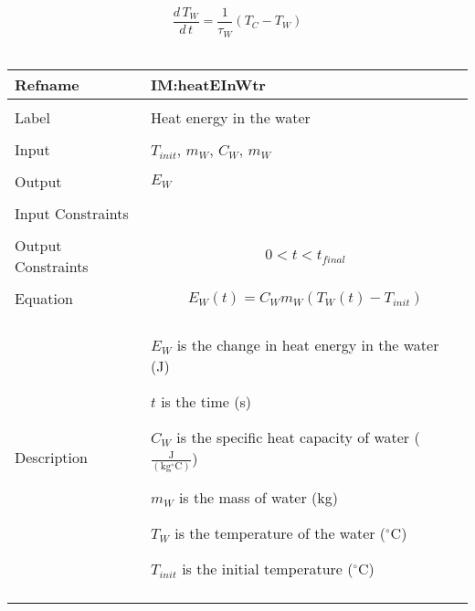 \documentclass[12pt]{article}
\begin{document}
\begin{dmath}
\frac{d\,{T_{W}}}{d\,t}=\frac{1}{{τ_{W}}} \left({T_{C}}-{T_{W}}\right)
\end{dmath}
~\newline
\noindent \begin{minipage}{\textwidth}
\begin{tabular}{p{} p{}}
\toprule \textbf{Refname} & \textbf{IM:heatEInWtr}
\label{IM:heatEInWtr}
\\ \midrule \\
Label & Heat energy in the water
\\ \midrule \\
Input & ${T_{init}}$, ${m_{W}}$, ${C_{W}}$, ${m_{W}}$
\\ \midrule \\
Output & ${E_{W}}$
\\ \midrule \\
Input Constraints & 
\\ \midrule \\
Output Constraints & \begin{dmath}
                     0<t<{t_{final}}
                     \end{dmath}
\\ \midrule \\
Equation & \begin{dmath}
           {E_{W}}\left(t\right)={C_{W}} {m_{W}} \left({T_{W}}\left(t\right)-{T_{init}}\right)
           \end{dmath}
\\ \midrule \\
Description & \begin{symbDescription}
              \item{${E_{W}}$ is the change in heat energy in the water (J)}
              \item{$t$ is the time (s)}
              \item{${C_{W}}$ is the specific heat capacity of water ($\frac{\text{J}}{(\text{kg}{}^{\circ}\text{C})}$)}
              \item{${m_{W}}$ is the mass of water (kg)}
              \item{${T_{W}}$ is the temperature of the water (${}^{\circ}$C)}
              \item{${T_{init}}$ is the initial temperature (${}^{\circ}$C)}
              \end{symbDescription}
\\ \midrule \\

\end{tabular}
\end{minipage}
\end{document}
